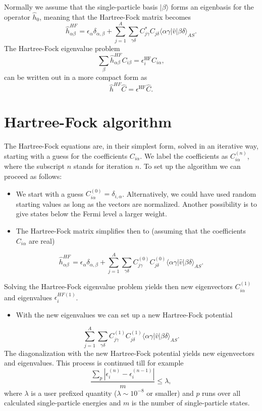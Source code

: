 \documentclass[graybox,sectrefs,envcountresetchap,open=right]{svmonodo}
\begin{document}
Normally we assume that the single-particle basis $|\beta\rangle$ forms an eigenbasis for the operator
$\hat{h}_0$, meaning that the Hartree-Fock matrix becomes  
\[
\hat{h}_{\alpha\beta}^{HF}=\epsilon_{\alpha}\delta_{\alpha,\beta}+
\sum_{j=1}^A\sum_{\gamma\delta} C^*_{j\gamma}C_{j\delta}\langle \alpha\gamma|\hat{v}|\beta\delta\rangle_{AS}.
\]
The Hartree-Fock eigenvalue problem
\[
\sum_{\beta}\hat{h}_{\alpha\beta}^{HF}C_{i\beta}=\epsilon_i^{\mathrm{HF}}C_{i\alpha},
\]
can be written out in a more compact form as
\[
\hat{h}^{HF}\hat{C}=\epsilon^{\mathrm{HF}}\hat{C}. 
\]



\section{Hartree-Fock algorithm}

The Hartree-Fock equations are, in their simplest form, solved in an iterative way, starting with a guess for the
coefficients $C_{i\alpha}$. We label the coefficients as $C_{i\alpha}^{(n)}$, where the subscript $n$ stands for iteration $n$.
To set up the algorithm we can proceed as follows:

\begin{itemize}
 \item We start with a guess $C_{i\alpha}^{(0)}=\delta_{i,\alpha}$. Alternatively, we could have used random starting values as long as the vectors are normalized. Another possibility is to give states below the Fermi level a larger weight.

 \item The Hartree-Fock matrix simplifies then to (assuming that the coefficients $C_{i\alpha} $  are real)
\end{itemize}

\noindent
\[
\hat{h}_{\alpha\beta}^{HF}=\epsilon_{\alpha}\delta_{\alpha,\beta}+
\sum_{j = 1}^A\sum_{\gamma\delta} C_{j\gamma}^{(0)}C_{j\delta}^{(0)}\langle \alpha\gamma|\hat{v}|\beta\delta\rangle_{AS}.
\]


Solving the Hartree-Fock eigenvalue problem yields then new eigenvectors $C_{i\alpha}^{(1)}$ and eigenvalues
$\epsilon_i^{HF(1)}$. 
\begin{itemize}
 \item With the new eigenvalues we can set up a new Hartree-Fock potential 
\end{itemize}

\noindent
\[
\sum_{j = 1}^A\sum_{\gamma\delta} C_{j\gamma}^{(1)}C_{j\delta}^{(1)}\langle \alpha\gamma|\hat{v}|\beta\delta\rangle_{AS}.
\]
The diagonalization with the new Hartree-Fock potential yields new eigenvectors and eigenvalues.
This process is continued till for example
\[
\frac{\sum_{p} |\epsilon_i^{(n)}-\epsilon_i^{(n-1)}|}{m} \le \lambda,  
\]
where $\lambda$ is a user prefixed quantity ($\lambda \sim 10^{-8}$ or smaller) and $p$ runs over all calculated single-particle
energies and $m$ is the number of single-particle states.
\end{document}
